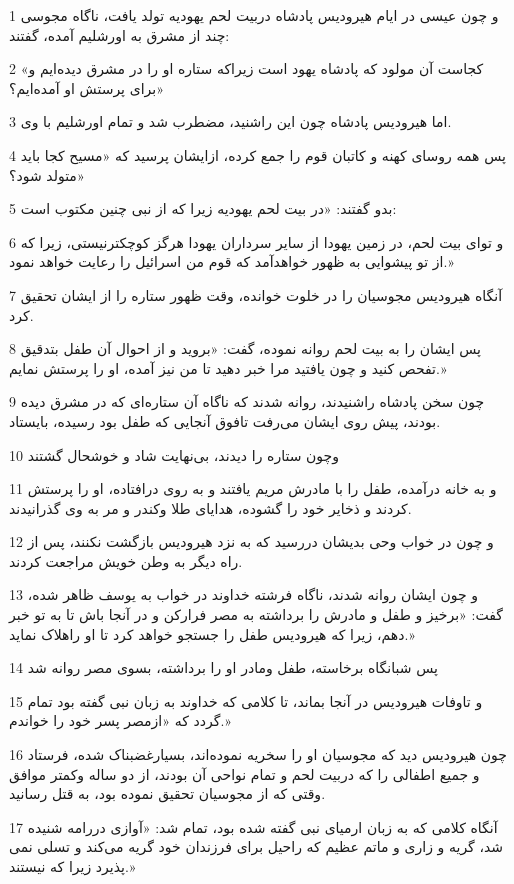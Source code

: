 \par 1 و چون عیسی در ایام هیرودیس پادشاه دربیت لحم یهودیه تولد یافت، ناگاه مجوسی چند از مشرق به اورشلیم آمده، گفتند:
\par 2 «کجاست آن مولود که پادشاه یهود است زیراکه ستاره او را در مشرق دیده‌ایم و برای پرستش او آمده‌ایم؟»
\par 3 اما هیرودیس پادشاه چون این راشنید، مضطرب شد و تمام اورشلیم با وی.
\par 4 پس همه روسای کهنه و کاتبان قوم را جمع کرده، ازایشان پرسید که «مسیح کجا باید متولد شود؟»
\par 5 بدو گفتند: «در بیت لحم یهودیه زیرا که از نبی چنین مکتوب است:
\par 6 و تو‌ای بیت لحم، در زمین یهودا از سایر سرداران یهودا هرگز کوچکترنیستی، زیرا که از تو پیشوایی به ظهور خواهدآمد که قوم من اسرائیل را رعایت خواهد نمود.»
\par 7 آنگاه هیرودیس مجوسیان را در خلوت خوانده، وقت ظهور ستاره را از ایشان تحقیق کرد.
\par 8 پس ایشان را به بیت لحم روانه نموده، گفت: «بروید و از احوال آن طفل بتدقیق تفحص کنید و چون یافتید مرا خبر دهید تا من نیز آمده، او را پرستش نمایم.»
\par 9 چون سخن پادشاه راشنیدند، روانه شدند که ناگاه آن ستاره‌ای که در مشرق دیده بودند، پیش روی ایشان می‌رفت تافوق آنجایی که طفل بود رسیده، بایستاد.
\par 10 وچون ستاره را دیدند، بی‌نهایت شاد و خوشحال گشتند
\par 11 و به خانه درآمده، طفل را با مادرش مریم یافتند و به روی در‌افتاده، او را پرستش کردند و ذخایر خود را گشوده، هدایای طلا وکندر و مر به وی گذرانیدند.
\par 12 و چون در خواب وحی بدیشان در‌رسید که به نزد هیرودیس بازگشت نکنند، پس از راه دیگر به وطن خویش مراجعت کردند.
\par 13 و چون ایشان روانه شدند، ناگاه فرشته خداوند در خواب به یوسف ظاهر شده، گفت: «برخیز و طفل و مادرش را برداشته به مصر فرارکن و در آنجا باش تا به تو خبر دهم، زیرا که هیرودیس طفل را جستجو خواهد کرد تا او راهلاک نماید.»
\par 14 پس شبانگاه برخاسته، طفل ومادر او را برداشته، بسوی مصر روانه شد
\par 15 و تاوفات هیرودیس در آنجا بماند، تا کلامی که خداوند به زبان نبی گفته بود تمام گردد که «ازمصر پسر خود را خواندم.»
\par 16 چون هیرودیس دید که مجوسیان او را سخریه نموده‌اند، بسیارغضبناک شده، فرستاد و جمیع اطفالی را که دربیت لحم و تمام نواحی آن بودند، از دو ساله وکمتر موافق وقتی که از مجوسیان تحقیق نموده بود، به قتل رسانید.
\par 17 آنگاه کلامی که به زبان ارمیای نبی گفته شده بود، تمام شد: «آوازی دررامه شنیده شد، گریه و زاری و ماتم عظیم که راحیل برای فرزندان خود گریه می‌کند و تسلی نمی پذیرد زیرا که نیستند.»
